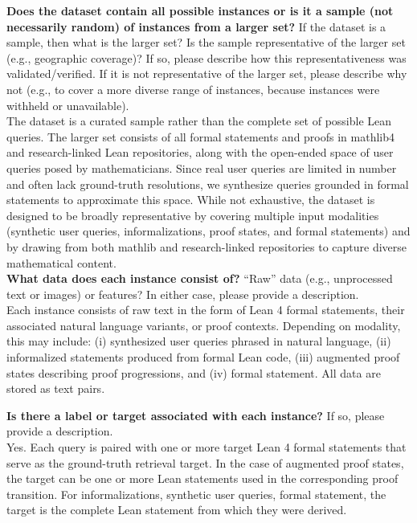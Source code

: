     \textcolor{\sectioncolor}{\textbf{Does the dataset contain all possible instances or is it a sample (not
    necessarily random) of instances from a larger set?
    }
    If the dataset is a sample, then what is the larger set? Is the sample
    representative of the larger set (e.g., geographic coverage)? If so, please
    describe how this representativeness was validated/verified. If it is not
    representative of the larger set, please describe why not (e.g., to cover a
    more diverse range of instances, because instances were withheld or
    unavailable).
    } \\
    The dataset is a curated sample rather than the complete set of possible Lean queries. The larger set consists of all formal statements and proofs in mathlib4 and research-linked Lean repositories, along with the open-ended space of user queries posed by mathematicians. Since real user queries are limited in number and often lack ground-truth resolutions, we synthesize queries grounded in formal statements to approximate this space. While not exhaustive, the dataset is designed to be broadly representative by covering multiple input modalities (synthetic user queries, informalizations, proof states, and formal statements) and by drawing from both mathlib and research-linked repositories to capture diverse mathematical content.
 \\
    
    \textcolor{\sectioncolor}{\textbf{What data does each instance consist of?
    }
    “Raw” data (e.g., unprocessed text or images) or features? In either case,
    please provide a description.
    } \\
Each instance consists of raw text in the form of Lean 4 formal statements, their associated natural language variants, or proof contexts. Depending on modality, this may include: (i) synthesized user queries phrased in natural language, (ii) informalized statements produced from formal Lean code, (iii) augmented proof states describing proof progressions, and (iv) formal statement. All data are stored as text pairs.

    
    \textcolor{\sectioncolor}{\textbf{Is there a label or target associated with each instance?
    }
    If so, please provide a description.
    } \\
    Yes. Each query is paired with one or more target Lean 4 formal statements that serve as the ground-truth retrieval target. In the case of augmented proof states, the target can be one or more Lean statements used in the corresponding proof transition. For informalizations, synthetic user queries, formal statement, the target is the complete Lean statement from which they were derived.
 \\
    
